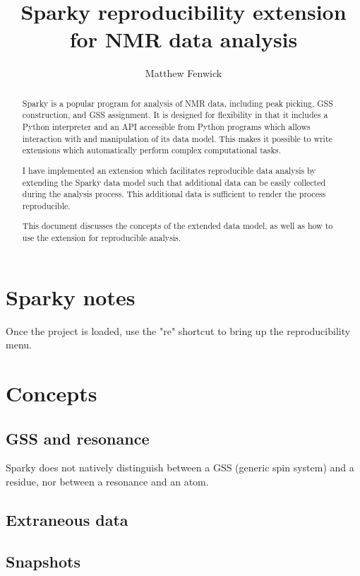 \documentclass[11pt,a4paper]{article}
\begin{document}
\author{Matthew Fenwick}
\title{Sparky reproducibility extension for NMR data analysis}
\maketitle

\begin{abstract}
Sparky is a popular program for analysis of NMR data, including peak picking,
GSS construction, and GSS assignment.  It is designed for flexibility in that
it includes a Python interpreter and an API accessible from Python programs
which allows interaction with and manipulation of its data model.  This makes
it possible to write extensions which automatically perform complex
computational tasks.

I have implemented an extension which facilitates reproducible data analysis
by extending the Sparky data model such that additional data can be easily
collected during the analysis process.  This additional data is sufficient
to render the process reproducible.

This document discusses the concepts of the extended data model, as well as
how to use the extension for reproducible analysis.
\end{abstract}

\tableofcontents
\listoftables
\listoffigures


\section{Sparky notes}
Once the project is loaded, use the "re" shortcut to bring up the 
reproducibility menu.




\section{Concepts}

\subsection{GSS and resonance}
Sparky does not natively distinguish between a GSS (generic spin system) and
a residue, nor between a resonance and an atom.

\subsection{Extraneous data}

\subsection{Snapshots}
\end{document}
